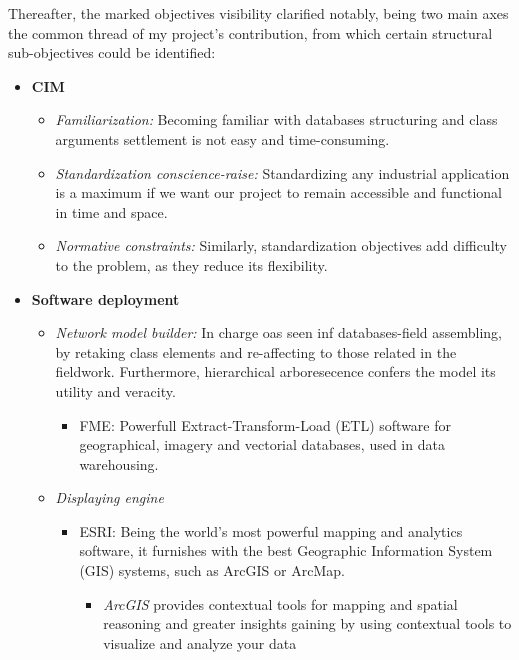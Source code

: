 Thereafter, the marked objectives visibility clarified notably, being two main axes the common thread of my project's contribution, from which certain structural sub-objectives could be identified:

\begin{itemize}
    \item \textbf{CIM}
    \begin{itemize}
        \item \textit{Familiarization:} 
        Becoming familiar with databases structuring and class arguments settlement is not easy and time-consuming.
        \item \textit{Standardization conscience-raise:}
        Standardizing any industrial application is a maximum if we want our project to remain accessible and functional in time and space.
        \item \textit{Normative constraints:} 
        Similarly, standardization objectives add difficulty to the problem, as they reduce its flexibility.
    \end{itemize}
    
    \item \textbf{Software deployment}
    \begin{itemize}
        \item\textit{Network model builder:} In charge oas seen inf databases-field assembling, by retaking class elements and re-affecting to those related in the fieldwork. Furthermore, hierarchical arboresecence confers the model its utility and veracity.
        \begin{itemize}
            \item FME: Powerfull Extract-Transform-Load (ETL) software for geographical, imagery and vectorial databases, used in data warehousing.
        \end{itemize}
        \item \textit{Displaying engine}
        \begin{itemize}
            \item ESRI: Being the world's most powerful mapping and analytics software, it furnishes with the best Geographic Information System (GIS) systems, such as ArcGIS or ArcMap. 
            \begin{itemize}
                \item \textit{ArcGIS} provides contextual tools for mapping and spatial reasoning and greater insights gaining by using contextual tools to visualize and analyze your data
            \end{itemize}
        \end{itemize}
    \end{itemize}
\end{itemize}

